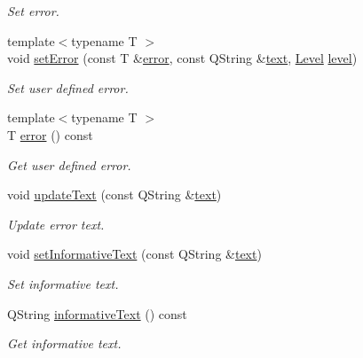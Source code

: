 \begin{DoxyCompactItemize}
\begin{DoxyCompactList}\small\item\em Set error. \end{DoxyCompactList}\item 
{\footnotesize template$<$typename T $>$ }\\void \hyperlink{class_mdt_1_1_error_a3f6e9656170e35c5a198bf05ccec9cd1}{set\+Error} (const T \&\hyperlink{class_mdt_1_1_error_a0d042250a76d0351b8c19367572f5e11}{error}, const Q\+String \&\hyperlink{class_mdt_1_1_error_a99327678615e8f2bddd22cd59482bfc2}{text}, \hyperlink{class_mdt_1_1_error_ab533dc690f68a8635232db594194a068}{Level} \hyperlink{class_mdt_1_1_error_a9c73117a49791ab87163b815d6a3e0c9}{level})
\begin{DoxyCompactList}\small\item\em Set user defined error. \end{DoxyCompactList}\item 
{\footnotesize template$<$typename T $>$ }\\T \hyperlink{class_mdt_1_1_error_a0d042250a76d0351b8c19367572f5e11}{error} () const 
\begin{DoxyCompactList}\small\item\em Get user defined error. \end{DoxyCompactList}\item 
void \hyperlink{class_mdt_1_1_error_a85d4e982ed7972b8d43f78129d6c51e6}{update\+Text} (const Q\+String \&\hyperlink{class_mdt_1_1_error_a99327678615e8f2bddd22cd59482bfc2}{text})
\begin{DoxyCompactList}\small\item\em Update error text. \end{DoxyCompactList}\item 
void \hyperlink{class_mdt_1_1_error_a12c8b4de8011d03fa7d45d8e653713ae}{set\+Informative\+Text} (const Q\+String \&\hyperlink{class_mdt_1_1_error_a99327678615e8f2bddd22cd59482bfc2}{text})
\begin{DoxyCompactList}\small\item\em Set informative text. \end{DoxyCompactList}\item 
Q\+String \hyperlink{class_mdt_1_1_error_a12fcf366a6bf68b8daaea4b43526e033}{informative\+Text} () const 
\begin{DoxyCompactList}\small\item\em Get informative text. \end{DoxyCompactList}\item 

\end{DoxyCompactItemize}
